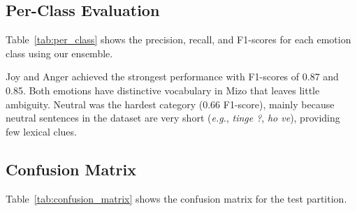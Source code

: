 \documentclass[conference]{IEEEtran}
\begin{document}
\subsection{Per-Class Evaluation}
Table~\ref{tab:per_class} shows the precision, recall, and F1-scores for each emotion class using our ensemble.

\begin{table}[htbp]
\caption{Detailed Classification Metrics of Our Ensemble}
\label{tab:per_class}
\centering
{}
\end{table}

Joy and Anger achieved the strongest performance with F1-scores of 0.87 and 0.85. Both emotions have distinctive vocabulary in Mizo that leaves little ambiguity. Neutral was the hardest category (0.66 F1-score), mainly because neutral sentences in the dataset are very short (\textit{e.g.}, \textit{tinge ?}, \textit{ho ve}), providing few lexical clues.

\subsection{Confusion Matrix}
Table~\ref{tab:confusion_matrix} shows the confusion matrix for the test partition.
\end{document}
